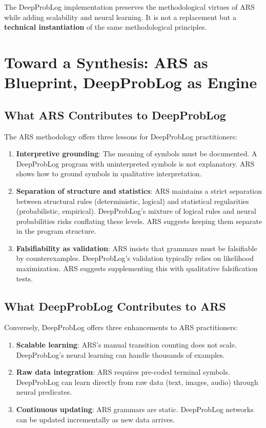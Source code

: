 \documentclass[12pt,a4paper]{article}
\begin{document}
The DeepProbLog implementation preserves the methodological virtues of ARS 
while adding scalability and neural learning. It is not a replacement but 
a \textbf{technical instantiation} of the same methodological principles.

\section{Toward a Synthesis: ARS as Blueprint, DeepProbLog as Engine}

\subsection{What ARS Contributes to DeepProbLog}

The ARS methodology offers three lessons for DeepProbLog practitioners:

\begin{enumerate}
    \item \textbf{Interpretive grounding}: The meaning of symbols must be 
    documented. A DeepProbLog program with uninterpreted symbols is not 
    explanatory. ARS shows how to ground symbols in qualitative interpretation.
    
    \item \textbf{Separation of structure and statistics}: ARS maintains a 
    strict separation between structural rules (deterministic, logical) and 
    statistical regularities (probabilistic, empirical). DeepProbLog's 
    mixture of logical rules and neural probabilities risks conflating these 
    levels. ARS suggests keeping them separate in the program structure.
    
    \item \textbf{Falsifiability as validation}: ARS insists that grammars 
    must be falsifiable by counterexamples. DeepProbLog's validation typically 
    relies on likelihood maximization. ARS suggests supplementing this with 
    qualitative falsification tests.
\end{enumerate}

\subsection{What DeepProbLog Contributes to ARS}

Conversely, DeepProbLog offers three enhancements to ARS practitioners:

\begin{enumerate}
    \item \textbf{Scalable learning}: ARS's manual transition counting does 
    not scale. DeepProbLog's neural learning can handle thousands of examples.
    
    \item \textbf{Raw data integration}: ARS requires pre-coded terminal 
    symbols. DeepProbLog can learn directly from raw data (text, images, 
    audio) through neural predicates.
    
    \item \textbf{Continuous updating}: ARS grammars are static. DeepProbLog 
    networks can be updated incrementally as new data arrives.
\end{enumerate}
\end{document}
